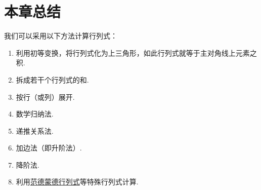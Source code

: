 \section{本章总结}
我们可以采用以下方法计算行列式：
\begin{enumerate}
	\item 利用初等变换，将行列式化为上三角形，如此行列式就等于主对角线上元素之积.
	\item 拆成若干个行列式的和.
	\item 按行（或列）展开.
	\item 数学归纳法.
	\item 递推关系法.
	\item 加边法（即升阶法）.
	\item 降阶法.
	\item 利用\hyperref[equation:行列式.范德蒙德行列式]{范德蒙德行列式}等特殊行列式计算.
\end{enumerate}
